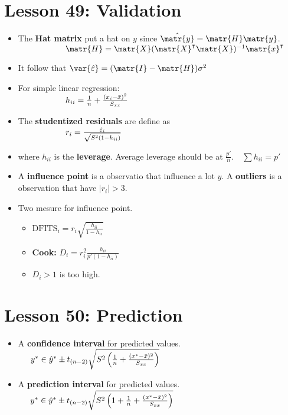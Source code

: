 \documentclass[10pt, french]{article}
\begin{document}
\begin{multicols*}{3}
\section*{Lesson 49: Validation}
\begin{itemize}[align=left,leftmargin=*]
   \item The \textbf{Hat matrix} put a hat on $y$ since $\hat{\matr{y}} = \matr{H}\matr{y}$. \\
   $\hspace*{2cm} \matr{H} = \matr{X}(\matr{X}^\intercal\matr{X})^{-1}\matr{x}^\intercal$
   \item It follow that $\var{\hat{\varepsilon}} = (\matr{I} - \matr{H})\sigma^2$
   \item For simple linear regression: \\
   $\hspace*{2cm}h_{ii} = \frac{1}{n} + \frac{(x_i - \bar{x})^2}{S_{xx}}$
   \item The \textbf{studentized residuals} are define as \\
   $\hspace*{2cm} r_i = \frac{\hat{\varepsilon}_i}{\sqrt{S^2(1 - h_{ii})}}$
   \item[] where $h_{ii}$ is the \textbf{leverage}. Average leverage should be at $\frac{p'}{n}$.$\quad \sum h_{ii} = p'$
   \item A \textbf{influence point} is a observatio that influence a lot $y$. A \textbf{outliers} is a observation that have $|r_i|>3$.
   \item Two mesure for influence point.
   \begin{itemize}
      \item $\mathrm{DFITS}_i = r_i \sqrt{\frac{h_{ii}}{1- h_{ii}}}$
      \item \textbf{Cook:} $D_i = r_i^2 \frac{h_{ii}}{p'(1 - h_{ii})}$
      \item[] $D_i>1$ is too high.
   \end{itemize}
 \end{itemize}

\section*{Lesson 50: Prediction}
\begin{itemize}[align=left,leftmargin=*]
    \item A \textbf{confidence interval} for predicted values. \\
    $\hspace*{0.5cm}y^{*} \in \hat{y}^{*} \pm t_{(n-2)} \sqrt{S^2\left(\frac{1}{n}+\frac{(x^{*} - \bar{x})^2}{S_{xx}}\right)}$
    \item A \textbf{prediction interval} for predicted values. \\
    $\hspace*{0.5cm}y^{*} \in \hat{y}^{*} \pm t_{(n-2)} \sqrt{S^2\left(1+\frac{1}{n}+\frac{(x^{*} - \bar{x})^2}{S_{xx}}\right)}$
\end{itemize}


\end{multicols*}
\end{document}

